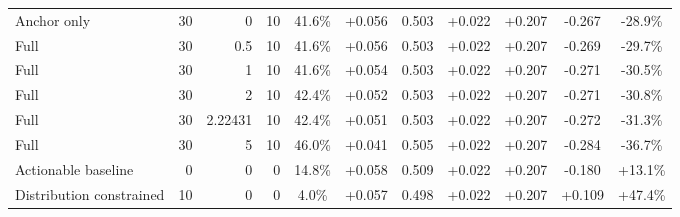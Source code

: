 \begin{table}[htbp]
\begin{tabular}{lrrrccccccc}
Anchor only & 30 & 0 & 10 & 41.6\% & +0.056 & 0.503 & +0.022 & +0.207 & -0.267 & -28.9\% \\
Full & 30 & 0.5 & 10 & 41.6\% & +0.056 & 0.503 & +0.022 & +0.207 & -0.269 & -29.7\% \\
Full & 30 & 1 & 10 & 41.6\% & +0.054 & 0.503 & +0.022 & +0.207 & -0.271 & -30.5\% \\
Full & 30 & 2 & 10 & 42.4\% & +0.052 & 0.503 & +0.022 & +0.207 & -0.271 & -30.8\% \\
Full & 30 & 2.22431 & 10 & 42.4\% & +0.051 & 0.503 & +0.022 & +0.207 & -0.272 & -31.3\% \\
Full & 30 & 5 & 10 & 46.0\% & +0.041 & 0.505 & +0.022 & +0.207 & -0.284 & -36.7\% \\
Actionable baseline & 0 & 0 & 0 & 14.8\% & +0.058 & 0.509 & +0.022 & +0.207 & -0.180 & +13.1\% \\
Distribution constrained & 10 & 0 & 0 & 4.0\% & +0.057 & 0.498 & +0.022 & +0.207 & +0.109 & +47.4\% \\
\bottomrule
\end{tabular}
\end{table}